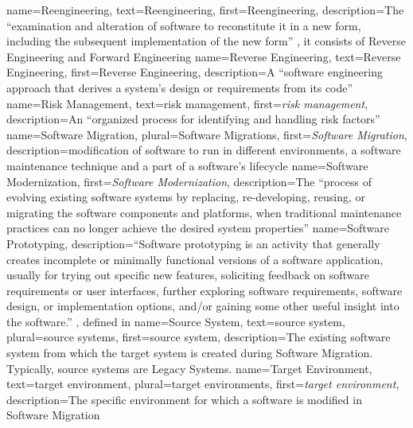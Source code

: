  {
  name=Reengineering,
  text=Reengineering,
  first={Reengineering}, 
  description={The ``examination and alteration of software to reconstitute it in a new form, including the subsequent implementation of the new form'' \autocite[][entry 3.3346]{ISO/IEEE24765Vocabulary}, it consists of \gls{Reverse Engineering} and \gls{Forward Engineering}}
}
 {
  name=Reverse Engineering,
  text=Reverse Engineering,
  first={Reverse Engineering}, 
  description={A ``software engineering approach that derives a system's design or requirements from its code'' \autocite[][entry 3.3501]{ISO/IEEE24765Vocabulary}}
}
 {
  name=Risk Management,
  text=risk management,
  first={\emph{risk management}}, 
  description={An ``organized process for identifying and handling risk factors'' \autocite[][entry 3.3528]{ISO/IEEE24765Vocabulary}}
}
 {
  name=Software Migration,
  plural=Software Migrations,
  first={\emph{Software Migration}}, 
  description={modification of software to run in different environments, a software maintenance technique and a part of a software's lifecycle \autocite[][p. 5-10]{SWEBOK2014}}
}
 {
  name=Software Modernization,
  first={\emph{Software Modernization}}, 
  description={The ``process of evolving existing software systems by replacing, re-developing, reusing, or migrating the software components and platforms, when traditional maintenance practices can no longer achieve the desired system properties'' \autocite[][6]{Khadka2016PHD}}
}
 {
  name=Software Prototyping, 
  description={``Software prototyping is an activity that generally creates incomplete or minimally functional versions of a software application, usually for trying out specific new features, soliciting feedback on software requirements or user interfaces, further exploring software requirements, software design, or implementation options, and/or gaining some other useful insight into the software.'' \autocite{SWEBOK2014}, defined in }
}
 {
  name=Source System,
  text=source system,
  plural=source systems,
  first={source system}, 
  description={The existing software system from which the \gls{target system} is created during \gls{Software Migration}. Typically, source systems are \glspl{Legacy System}.}
}
 {
  name=Target Environment,
  text=target environment,
  plural=target environments,
  first={\emph{target environment}}, 
  description={The specific environment for which a software is modified in \gls{Software Migration}}
}
